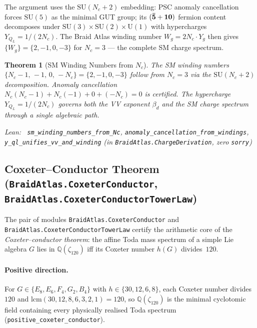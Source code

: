\documentclass[11pt,a4paper]{article}
\newenvironment{leanref}%
  {\par\smallskip\noindent\begingroup\raggedright\textup{Lean:}~}%
  {\par\endgroup}
\newtheorem{theorem}{Theorem}[section]
\theoremstyle{definition}
\begin{document}
The argument uses the $\mathrm{SU}(N_c{+}2)$ embedding: PSC anomaly cancellation
forces $\mathrm{SU}(5)$ as the minimal GUT group; its $({\bf\bar 5}+{\bf 10})$
fermion content decomposes under $\mathrm{SU}(3){\times}\mathrm{SU}(2){\times}\mathrm{U}(1)$
with hypercharges $Y_{Q_L} = 1/(2N_c)$.
The Braid Atlas winding number $W_g = 2N_c \cdot Y_g$ then gives
$\{W_g\} = \{2,-1,0,-3\}$ for $N_c = 3$ --- the complete SM charge spectrum.

\begin{theorem}[SM Winding Numbers from $N_c$]\label{thm:sm_winding_from_Nc}
The SM winding numbers $\{N_c{-}1,\,-1,\,0,\,-N_c\} = \{2,-1,0,-3\}$ follow
from $N_c = 3$ via the $\mathrm{SU}(N_c+2)$ decomposition.
Anomaly cancellation $N_c(N_c-1) + N_c(-1) + 0 + (-N_c) = 0$ is certified.
The hypercharge $Y_{Q_L} = 1/(2N_c)$ governs both the VV exponent $\beta_d$
and the SM charge spectrum through a single algebraic path.
\begin{leanref} \lstinline|sm_winding_numbers_from_Nc|,
\lstinline|anomaly_cancellation_from_windings|,
\lstinline|y_ql_unifies_vv_and_winding|
\textup{(in \texttt{BraidAtlas.ChargeDerivation}, zero \texttt{sorry})}
\end{leanref}
\end{theorem}

\subsection[Coxeter--Conductor Theorem]{Coxeter--Conductor Theorem (\texttt{BraidAtlas.CoxeterConductor},
            \texttt{BraidAtlas.CoxeterConductorTowerLaw})}
\label{sec:coxeter_conductor}

The pair of modules \texttt{BraidAtlas.CoxeterConductor} and
\texttt{BraidAtlas.CoxeterConductorTowerLaw} certify the arithmetic core
of the \emph{Coxeter--conductor theorem}: the affine Toda mass spectrum
of a simple Lie algebra $G$ lies in $\mathbb{Q}(\zeta_{120})$ iff its
Coxeter number $h(G)$ divides~$120$.

\paragraph{Positive direction.}
For $G \in \{E_8, E_6, F_4, G_2, B_4\}$ with $h \in \{30, 12, 6, 8\}$,
each Coxeter number divides $120$ and
$\mathrm{lcm}(30, 12, 8, 6, 3, 2, 1) = 120$, so $\mathbb{Q}(\zeta_{120})$
is the minimal cyclotomic field containing every physically realised
Toda spectrum (\lstinline|positive_coxeter_conductor|).
\end{document}
